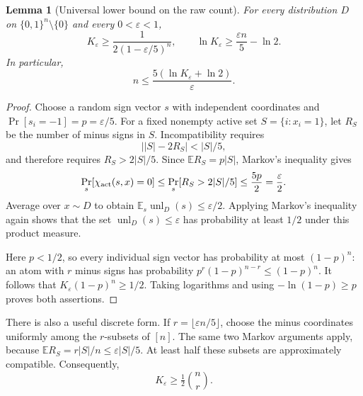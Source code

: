 \documentclass[11pt,a4paper]{article}
\newtheorem{lemma}[theorem]{Lemma}
\theoremstyle{remark}
\newcommand{\unl}{\operatorname{unl}}
\newcommand{\1}{\mathbf 1}
\begin{document}
\begin{lemma}[Universal lower bound on the raw count]\label{lem:count}
For every distribution $D$ on $\{0,1\}^n\setminus\{0\}$ and every
$0<\varepsilon<1$,
\begin{equation}\label{eq:countbound}
 K_\varepsilon\ge
 \frac{1}{2(1-\varepsilon/5)^n},
 \qquad
 \ln K_\varepsilon\ge\frac{\varepsilon n}{5}-\ln2.
\end{equation}
In particular,
\begin{equation}\label{eq:dimension}
 n\le\frac{5(\ln K_\varepsilon+\ln2)}{\varepsilon}.
\end{equation}
\end{lemma}
\begin{proof}
Choose a random sign vector $s$ with independent coordinates and
$\Pr[s_i=-1]=p=\varepsilon/5$. For a fixed nonempty active set
$S=\{i:x_i=1\}$, let $R_S$ be the number of minus signs in $S$.
Incompatibility requires
\[
 \big||S|-2R_S\big|<|S|/5,
\]
and therefore requires $R_S>2|S|/5$. Since $\mathbb E R_S=p|S|$, Markov's
inequality gives
\[
 \Pr_s[\chi_{\rm act}(s,x)=0]
 \le\Pr_s[R_S>2|S|/5]\le\frac{5p}{2}=\frac{\varepsilon}{2}.
\]
Average over $x\sim D$ to obtain
$\mathbb E_s\unl_D(s)\le\varepsilon/2$. Applying Markov's inequality again
shows that the set $\unl_D(s)\le\varepsilon$ has probability at least $1/2$
under this product measure.

Here $p<1/2$, so every individual sign vector has probability at most
$(1-p)^n$: an atom with $r$ minus signs has probability
$p^r(1-p)^{n-r}\le(1-p)^n$. It follows that
$K_\varepsilon(1-p)^n\ge1/2$. Taking logarithms and using
$-\ln(1-p)\ge p$ proves both assertions.
\end{proof}

There is also a useful discrete form. If
$r=\lfloor\varepsilon n/5\rfloor$, choose the minus coordinates uniformly
among the $r$-subsets of $[n]$. The same two Markov arguments apply, because
$\mathbb E R_S=r|S|/n\le\varepsilon|S|/5$. At least half these subsets are
approximately compatible. Consequently,
\begin{equation}\label{eq:binomialcount}
 K_\varepsilon\ge\tfrac12\binom nr.
\end{equation}
\end{document}
